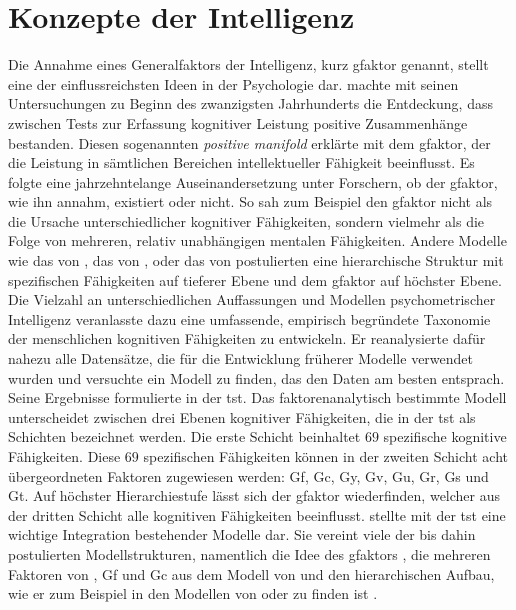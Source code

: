 \documentclass[11pt, twoside, a4paper]{book}		%
\begin{document}
\section{Konzepte der Intelligenz}

Die Annahme eines Generalfaktors der Intelligenz, kurz \gls{gfaktor} genannt, stellt eine der einflussreichsten Ideen in der Psychologie dar. \citet{Spearman1904, Spearman1927} machte mit seinen Untersuchungen zu Beginn des zwanzigsten Jahrhunderts die Entdeckung, dass zwischen Tests zur Erfassung kognitiver Leistung positive Zusammenhänge bestanden. Diesen sogenannten \textit{positive man\-i\-fold} erklärte \citeauthor{Spearman1927} mit dem \gls{gfaktor}, der die Leistung in sämtlichen Bereichen intellektueller Fähigkeit beeinflusst. Es folgte eine jahrzehntelange Auseinandersetzung unter Forschern, ob der \gls{gfaktor}, wie ihn \citeauthor{Spearman1927} annahm, existiert oder nicht. So sah zum Beispiel \citet{Thurstone1938} den \gls{gfaktor} nicht als die Ursache unterschiedlicher kognitiver Fähigkeiten, sondern vielmehr als die Folge von mehreren, relativ unabhängigen mentalen Fähigkeiten. Andere Modelle wie das von \citet{Vernon1950}, das von \citet{Cattell1971}, oder das von \citet{Jaeger1984} postulierten eine hierarchische Struktur mit spezifischen Fähigkeiten auf tieferer Ebene und dem \gls{gfaktor} auf höchster Ebene. 
Die Vielzahl an unterschiedlichen Auffassungen und Modellen psychometrischer Intelligenz veranlasste \citet{Carroll1993} dazu eine umfassende, empirisch begründete Taxonomie der menschlichen kognitiven Fähigkeiten zu entwickeln. Er reanalysierte dafür nahezu alle Datensätze, die für die Entwicklung früherer Modelle verwendet wurden und versuchte ein Modell zu finden, das den Daten am besten entsprach. Seine Ergebnisse formulierte \citeauthor{Carroll1993} in der \gls{tst}.
Das faktorenanalytisch bestimmte Modell unterscheidet zwischen drei Ebenen kognitiver Fähigkeiten, die in der \gls{tst} als Schichten bezeichnet werden. Die erste Schicht beinhaltet $69$ spezifische kognitive Fähigkeiten. Diese $69$ spezifischen Fähigkeiten können in der zweiten Schicht acht übergeordneten Faktoren zugewiesen werden: \gls{Gf}, \gls{Gc}, \gls{Gy}, \gls{Gv}, \gls{Gu}, \gls{Gr}, \gls{Gs} und \gls{Gt}. 
Auf höchster Hierarchiestufe lässt sich der \gls{gfaktor} wiederfinden, welcher aus der dritten Schicht alle kognitiven Fähigkeiten beeinflusst.
\citeauthor{Carroll1993} stellte mit der \gls{tst} eine wichtige Integration bestehender Modelle dar. 
Sie vereint viele der bis dahin postulierten Modellstrukturen, namentlich die Idee des \gls{gfaktor}s \citep{Spearman1904, Spearman1927}, die mehreren Faktoren von \citet{Thurstone1938}, \gls{Gf} und \gls{Gc} aus dem Modell von \citet{Cattell1971} und den hierarchischen Aufbau, wie er zum Beispiel in den Modellen von \citet{Vernon1950} oder \citet{Jaeger1984} zu finden ist \citep[für Erweiterungen der \gls{tst} siehe][]{McGrew2005, McGrew2009}.
\end{document}
